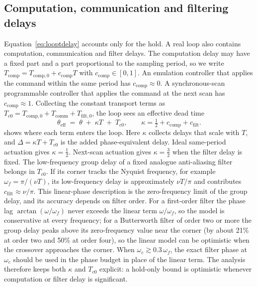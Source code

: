 \documentclass[a4paper,fleqn]{cas-sc}
\theoremstyle{remark}
\newcommand{\thetaeff}{\theta_{\mathrm{eff}}}
\newcommand{\wc}{\omega_c}
\begin{document}
\subsection{Computation, communication and filtering delays}
\label{sec:delaybudget}
Equation~\eqref{eq:looptdelay} accounts only for the hold. A real loop also contains computation, communication and filter delays. The computation delay may have a fixed part and a part proportional to the sampling period, so we write
$T_{\mathrm{comp}}=T_{\mathrm{comp},0}+c_{\mathrm{comp}}T$ with
$c_{\mathrm{comp}}\in[0,1]$. An emulation controller that applies the command
within the same period has $c_{\mathrm{comp}}\approx0$. A synchronous-scan
programmable controller that applies the command at the next scan has
$c_{\mathrm{comp}}\approx1$. Collecting the constant transport terms
as $T_{c0}=T_{\mathrm{comp},0}+T_{\mathrm{comm}}+T_{\mathrm{filt},0}$, the
loop sees an effective dead time
\begin{equation}
\thetaeff \;=\; \theta \;+\; \kappa T \;+\; T_{c0},\qquad
\kappa=\tfrac{1}{2}+c_{\mathrm{comp}}+c_{\mathrm{filt}}.
\label{eq:thetaeff}
\end{equation}
 shows where each term enters the loop.
Here $\kappa$ collects delays that scale with $T$, and $\Delta=\kappa T+T_{c0}$ is the added phase-equivalent delay. Ideal same-period actuation gives $\kappa=\tfrac12$. Next-scan actuation gives $\kappa=\tfrac32$ when the filter delay is fixed. The low-frequency group delay of a fixed analogue anti-aliasing filter belongs in $T_{c0}$. If its corner tracks the Nyquist frequency, for example $\omega_f=\pi/(\nu T)$, its low-frequency delay is approximately $\nu T/\pi$ and contributes $c_{\mathrm{filt}}\approx\nu/\pi$. This linear-phase description is the zero-frequency limit of the group delay, and its accuracy depends on filter order. For a first-order filter the phase lag $\arctan(\omega/\omega_f)$ never exceeds the linear term $\omega/\omega_f$, so the model is conservative at every frequency; for a Butterworth filter of order two or more the group delay peaks above its zero-frequency value near the corner (by about 21\% at order two and 50\% at order four), so the linear model can be optimistic when the crossover approaches the corner. When $\wc\gtrsim0.3\,\omega_f$, the exact filter phase at $\wc$ should be used in the phase budget in place of the linear term. The analysis therefore keeps both $\kappa$ and $T_{c0}$ explicit: a hold-only bound is optimistic whenever computation or filter delay is significant.
\end{document}
